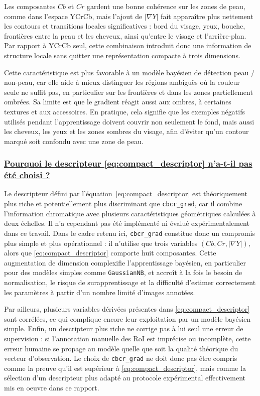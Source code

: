Les composantes \(Cb\) et \(Cr\) gardent une bonne coh\'erence sur les zones de peau, comme dans l'espace YCrCb, mais l'ajout de \(|\nabla Y|\) fait appara\^itre plus nettement les contours et transitions locales significatives : bord du visage, yeux, bouche, fronti\`eres entre la peau et les cheveux, ainsi qu'entre le visage et l'arri\`ere-plan. Par rapport \`a YCrCb seul, cette combinaison introduit donc une information de structure locale sans quitter une repr\'esentation compacte \`a trois dimensions.

Cette caract\'eristique est plus favorable \`a un mod\`ele bay\'esien de d\'etection peau / non-peau, car elle aide \`a mieux distinguer les r\'egions ambigu\"es o\`u la couleur seule ne suffit pas, en particulier sur les fronti\`eres et dans les zones partiellement ombr\'ees. Sa limite est que le gradient r\'eagit aussi aux ombres, \`a certaines textures et aux accessoires. En pratique, cela signifie que les exemples n\'egatifs utilis\'es pendant l'apprentissage doivent couvrir non seulement le fond, mais aussi les cheveux, les yeux et les zones sombres du visage, afin d'\'eviter qu'un contour marqu\'e soit confondu avec une zone de peau.

\subsubsection{\underline{\textbf{Pourquoi le descripteur \eqref{eq:compact_descriptor} n'a-t-il pas été choisi ?}}}

Le descripteur d\'efini par l'\'equation~\eqref{eq:compact_descriptor} est th\'eoriquement plus riche et potentiellement plus discriminant que \texttt{cbcr\_grad}, car il combine l'information chromatique avec plusieurs caract\'eristiques g\'eom\'etriques calcul\'ees \`a deux \'echelles. Il n'a cependant pas \'et\'e impl\'ement\'e ni \'evalu\'e exp\'erimentalement dans ce travail. Dans le cadre retenu ici, \texttt{cbcr\_grad} constitue donc un compromis plus simple et plus op\'erationnel : il n'utilise que trois variables \((Cb, Cr, |\nabla Y|)\), alors que \eqref{eq:compact_descriptor} comporte huit composantes. Cette augmentation de dimension complexifie l'apprentissage bay\'esien, en particulier pour des mod\`eles simples comme \texttt{GaussianNB}, et accro\^it \`a la fois le besoin de normalisation, le risque de surapprentissage et la difficult\'e d'estimer correctement les param\`etres \`a partir d'un nombre limit\'e d'images annot\'ees.

Par ailleurs, plusieurs variables d\'eriv\'ees pr\'esentes dans \eqref{eq:compact_descriptor} sont corr\'el\'ees, ce qui complique encore leur exploitation par un mod\`ele bay\'esien simple. Enfin, un descripteur plus riche ne corrige pas \`a lui seul une erreur de supervision : si l'annotation manuelle des RoI est impr\'ecise ou incompl\`ete, cette erreur humaine se propage au mod\`ele quelle que soit la qualit\'e th\'eorique du vecteur d'observation. Le choix de \texttt{cbcr\_grad} ne doit donc pas \^etre compris comme la preuve qu'il est sup\'erieur \`a \eqref{eq:compact_descriptor}, mais comme la s\'election d'un descripteur plus adapt\'e au protocole exp\'erimental effectivement mis en oeuvre dans ce rapport.
